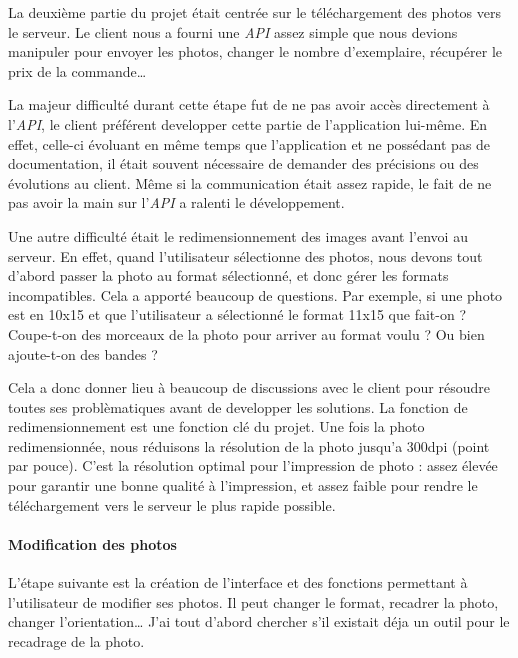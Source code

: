 \bigskip

La deuxième partie du projet était centrée sur le téléchargement des
photos vers le serveur. Le client nous a fourni une \emph{API} assez
simple que nous devions manipuler pour envoyer les photos, changer le
nombre d'exemplaire, récupérer le prix de la commande\ldots{}

\bigskip

La majeur difficulté durant cette étape fut de ne pas avoir accès
directement à l'\emph{API}, le client préférent developper cette partie
de l'application lui-même. En effet, celle-ci évoluant en même temps que
l'application et ne possédant pas de documentation, il était souvent
nécessaire de demander des précisions ou des évolutions au client. Même
si la communication était assez rapide, le fait de ne pas avoir la main
sur l'\emph{API} a ralenti le développement.

\bigskip

Une autre difficulté était le redimensionnement des images avant l'envoi
au serveur. En effet, quand l'utilisateur sélectionne des photos, nous
devons tout d'abord passer la photo au format sélectionné, et donc gérer
les formats incompatibles. Cela a apporté beaucoup de questions. Par
exemple, si une photo est en 10x15 et que l'utilisateur a sélectionné le
format 11x15 que fait-on ? Coupe-t-on des morceaux de la photo pour
arriver au format voulu ? Ou bien ajoute-t-on des bandes ?

\bigskip

Cela a donc donner lieu à beaucoup de discussions avec le client pour
résoudre toutes ses problèmatiques avant de developper les solutions. La
fonction de redimensionnement est une fonction clé du projet. Une fois
la photo redimensionnée, nous réduisons la résolution de la photo
jusqu'a 300dpi (point par pouce). C'est la résolution optimal pour
l'impression de photo : assez élevée pour garantir une bonne qualité à
l'impression, et assez faible pour rendre le téléchargement vers le
serveur le plus rapide possible.

\bigskip

\paragraph{Modification des photos}\label{modification-des-photos}

\bigskip

L'étape suivante est la création de l'interface et des fonctions
permettant à l'utilisateur de modifier ses photos. Il peut changer le
format, recadrer la photo, changer l'orientation\ldots{} J'ai tout
d'abord chercher s'il existait déja un outil pour le recadrage de la
photo.

